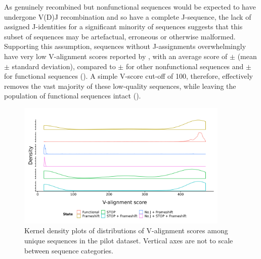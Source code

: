 As genuinely recombined but nonfunctional sequences would be expected to have undergone V(D)J recombination and so have a complete J-sequence, the lack of assigned J-identities for a significant minority of sequences suggests that this subset of sequences may be artefactual, erroneous or otherwise malformed. Supporting this assumption, sequences without J-assignments overwhelmingly have very low V-alignment scores reported by , with an average score of  $\pm$  (mean $\pm$ standard deviation), compared to  $\pm$  for other nonfunctional sequences and  $\pm$  for functional sequences (). A simple V-score cut-off of 100, therefore, effectively removes the vast majority of these low-quality sequences, while leaving the population of functional sequences intact ().

\begin{figure}
\centering
\includegraphics[width = 0.9\textwidth]{_Figures/png/pilot-functional-vscores}
\caption{Kernel density plots of distributions of V-alignment scores among unique sequences in the pilot \igseq dataset. Vertical axes are not to scale between sequence categories.}
\label{fig:igseq-pilot-functional-vscores}
\end{figure}

